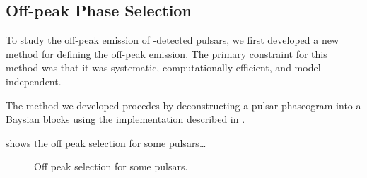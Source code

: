 \subsection{Off-peak Phase Selection}
\label{subsec:off_peak_defintion}



To study the off-peak emission of \lat-detected pulsars, we first
developed a new method for defining the off-peak emission.
The primary constraint for this method was that it was systematic,
computationally efficient, and model independent.

The method we developed procedes by deconstructing a pulsar phaseogram
into a Baysian blocks using the implementation described in \cite{Jackson_Bayesian_Blocks_2003}.




 shows the off peak selection for some pulsars\dots


\begin{figure}
  \ifdefined\bwfigures
  \else
  \fi
  \caption{Off peak selection for some pulsars. 
  }
  \label{fig:off_peak_select}
\end{figure}

